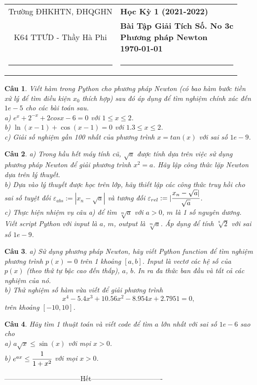 \documentclass[11pt]{article}
\newtheorem{bt}{Câu}
\begin{document}

\begin{tabular*}
	{\linewidth}{c>{\centering\hspace{0pt}} p{}}
	Trường ĐHKHTN, ĐHQGHN & {\bf Học Kỳ 1 (2021-2022)}
	\tabularnewline
	K64 TTƯD - Thầy Hà Phi & {\bf Bài Tập Giải Tích Số. No 3c \\ Phương pháp Newton  \\ \today}
	\tabularnewline
	\rule{1in}{1pt}  \small  & \rule{2in}{1pt} %
	\tabularnewline
	
\end{tabular*}
%

\begin{bt} %
Viết hàm trong Python cho phương pháp Newton (có bao hàm bước tiền xử lý để tìm điều kiện $x_0$ thích hợp) sau đó áp dụng để tìm nghiệm chính xác đến $1e-5$ cho các bài toán sau.\\
a) $e^x + 2^{-x} + 2 cos x - 6 = 0$ với $1 \leq x \leq 2$. \\
b) $\ln(x - 1) + \cos(x - 1) = 0$ với $1.3 \leq x \leq 2$. \\
c) Giải số nghiệm gần 100 nhất của phương trình $x=tan(x)$ với sai số $1e-9$.
\end{bt}

\begin{bt} %
a) Trong hầu hết máy tính cũ, $\sqrt{a}$ được tính dựa trên việc sử dụng phương pháp Newton để giải phương trình $x^2=a$. Hãy lập công thức lặp Newton dựa trên lý thuyết.  \\
b) Dựa vào lý thuyết được học trên lớp, hãy thiết lập các công thức truy hồi cho sai số tuyệt đối $\varepsilon_{abs}:=|x_n-\sqrt{a}|$ và tương đối $\varepsilon_{rel}:=|\cfrac{x_n-\sqrt{a}|}{\sqrt{a}}$.\\
c) Thực hiện nhiệm vụ câu a) để tìm $\sqrt[m]{a}$ với $a>0$, $m$ là 1 số nguyên dương. Viết script Python với input là $a$, $m$, output là $\sqrt[m]{a}$. Áp dụng để tính $\sqrt[8]{2}$ với 
sai số $1e-9$.
\end{bt}

\begin{bt} %
a) Sử dụng phương pháp Newton, hãy viết Python function để tìm nghiệm phương trình $p(x)=0$ trên 1 khoảng $[a,b]$. Input là vectơ các hệ số của $p(x)$ (theo thứ tự bậc cao đến thấp), $a$, $b$. In ra đa thức ban đầu và tất cả các nghiệm của nó. \\
b) Thử nghiệm số hàm vừa viết để giải phương trình 
%
\[ x^4 - 5.4 x^3 + 10.56 x^2 - 8.954 x + 2.7951 = 0, \]
%
trên khoảng $[-10,10]$. 
\end{bt}

\begin{bt} %
Hãy tìm 1 thuật toán và viết code để tìm $a$ lớn nhất với sai số $1e-6$ sao cho\\
a) $a \sqrt{x} \leq \sin(x)$ với mọi $x>0$. \\
b) $e^{ax} \leq \cfrac{1}{1+x^2}$ với mọi $x>0$.
\end{bt}

\centerline{———————————Hết——————————-}
\end{document}
